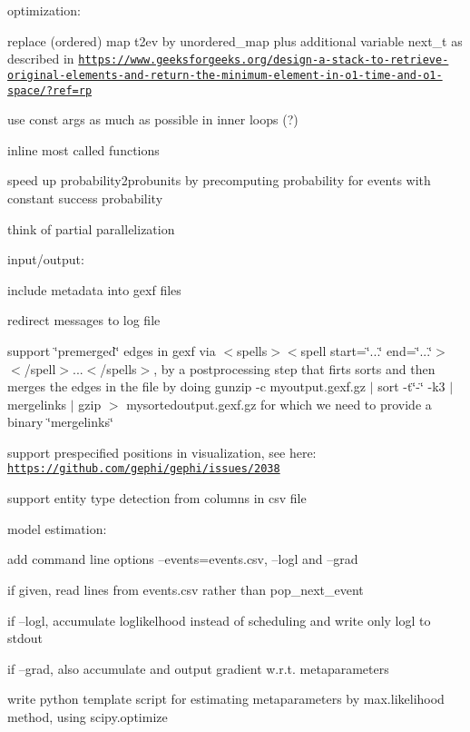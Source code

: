 optimization\+:
\begin{DoxyItemize}
\item replace (ordered) map t2ev by unordered\+\_\+map plus additional variable next\+\_\+t as described in \href{https://www.geeksforgeeks.org/design-a-stack-to-retrieve-original-elements-and-return-the-minimum-element-in-o1-time-and-o1-space/?ref=rp}{\tt https\+://www.\+geeksforgeeks.\+org/design-\/a-\/stack-\/to-\/retrieve-\/original-\/elements-\/and-\/return-\/the-\/minimum-\/element-\/in-\/o1-\/time-\/and-\/o1-\/space/?ref=rp}
\item use const args as much as possible in inner loops (?)
\item inline most called functions
\item speed up probability2probunits by precomputing probability for events with constant success probability
\item think of partial parallelization
\end{DoxyItemize}

input/output\+:
\begin{DoxyItemize}
\item include metadata into gexf files
\item redirect messages to log file
\item support \char`\"{}premerged\char`\"{} edges in gexf via $<$spells$>$$<$spell start=\char`\"{}...\char`\"{} end=\char`\"{}...\char`\"{}$>$$<$/spell$>$...$<$/spells$>$, by a postprocessing step that firts sorts and then merges the edges in the file by doing {\ttfamily gunzip -\/c myoutput.\+gexf.\+gz $\vert$ sort -\/t\char`\"{}-\/\char`\"{} -\/k3 $\vert$ mergelinks $\vert$ gzip $>$ mysortedoutput.\+gexf.\+gz} for which we need to provide a binary \char`\"{}mergelinks\char`\"{}
\item support prespecified positions in visualization, see here\+: \href{https://github.com/gephi/gephi/issues/2038}{\tt https\+://github.\+com/gephi/gephi/issues/2038}
\item support entity type detection from columns in csv file
\end{DoxyItemize}

model estimation\+:
\begin{DoxyItemize}
\item add command line options --events=events.\+csv, --logl and --grad
\item if given, read lines from events.\+csv rather than pop\+\_\+next\+\_\+event
\item if --logl, accumulate loglikelhood instead of scheduling and write only logl to stdout
\item if --grad, also accumulate and output gradient w.\+r.\+t. metaparameters
\item write python template script for estimating metaparameters by max.\+likelihood method, using scipy.\+optimize
\end{DoxyItemize}

